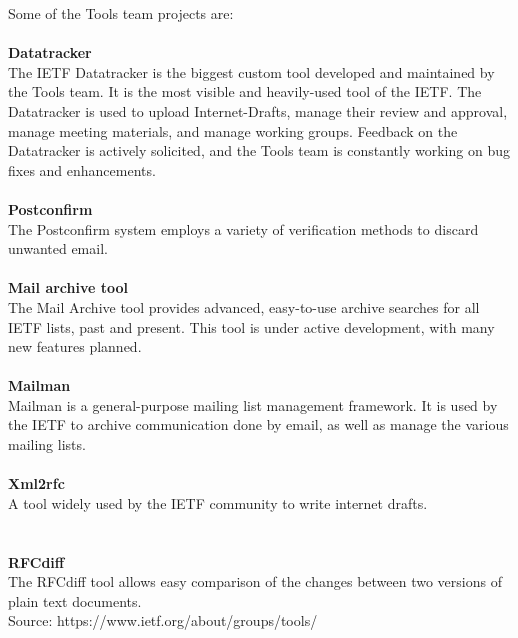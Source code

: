 \documentclass[a4paper,english]{report}
\begin{document}
Some of the Tools team projects are: \\\\
\textbf{Datatracker}\\
The IETF Datatracker is the biggest custom tool developed and maintained by the Tools team. It is the most visible and heavily-used tool of the IETF. The Datatracker is used to upload Internet-Drafts, manage their review and approval, manage meeting materials, and manage working groups. Feedback on the Datatracker is actively solicited, and the Tools team is constantly working on bug fixes and enhancements.\\
\\\textbf{Postconfirm}\\
The Postconfirm system employs a variety of verification methods to discard unwanted email.\\
\\\textbf{Mail archive tool}\\
The Mail Archive tool provides advanced, easy-to-use archive searches for all IETF lists, past and present. This tool is under active development, with many new features planned.\\
\\\textbf{Mailman}\\
Mailman is a general-purpose mailing list management framework. It is used by the IETF to archive communication done by email, as well as manage the various mailing lists.\\
\\\textbf{Xml2rfc}\\
A tool widely used by the IETF community to write internet drafts. \\\\
\\\textbf{RFCdiff}\\
The RFCdiff tool allows easy comparison of the changes between two versions of plain text documents.\\

Source: https://www.ietf.org/about/groups/tools/
\end{document}
